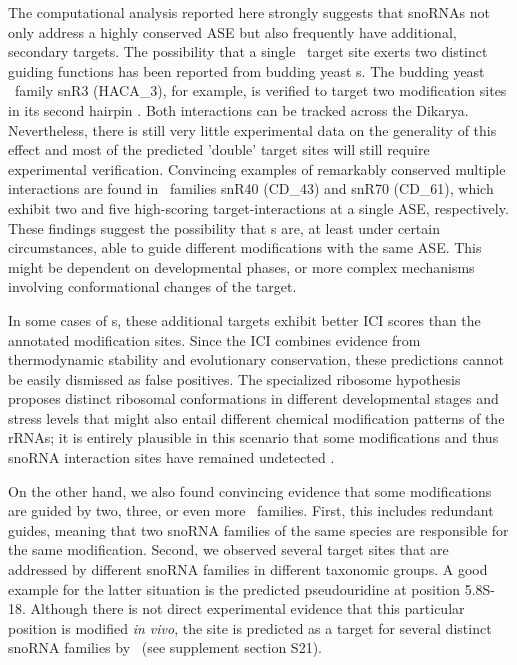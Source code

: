 The computational analysis reported here strongly suggests that
snoRNAs not only address a highly conserved ASE but also frequently
have additional, secondary targets. The possibility that a single
\sno\ target site exerts two distinct guiding functions has been
reported from budding yeast \haca s. The budding yeast \sno\ family
snR3 (HACA\_3), for example, is verified to target two modification
sites in its second hairpin \cite{Schattner:2004}.  Both interactions
can be tracked across the Dikarya.  Nevertheless, there is still very
little experimental data on the generality of this effect and most of
the predicted 'double' target sites will still require experimental
verification. Convincing examples of remarkably conserved multiple
interactions are found in \cd\ families snR40 (CD\_43) and snR70
(CD\_61), which exhibit two and five high-scoring target-interactions
at a single ASE, respectively.  These findings suggest the possibility
that \sno s are, at least under certain circumstances, able to guide
different modifications with the same ASE. This might be dependent on
developmental phases, or more complex mechanisms involving
conformational changes of the target.

In some cases of \haca s, these additional targets exhibit better ICI
scores than the annotated modification sites. Since the ICI combines
evidence from thermodynamic stability and evolutionary conservation,
these predictions cannot be easily dismissed as false positives. The
specialized ribosome hypothesis proposes distinct ribosomal
conformations in different developmental stages and stress levels that
might also entail different chemical modification patterns of the
rRNAs; it is entirely plausible in this scenario that some
modifications and thus snoRNA interaction sites have remained
undetected \citep{Xue:2012}.  

On the other hand, we also found convincing evidence that some
modifications are guided by two, three, or even more \sno\
families. First, this includes redundant guides, meaning that two
snoRNA families of the same species are responsible for the same
modification. Second, we observed several target sites that are
addressed by different snoRNA families in different taxonomic
groups. A good example for the latter situation is the predicted
pseudouridine at position 5.8S-18. Although there is not direct
experimental evidence that this particular position is modified
\emph{in vivo}, the site is predicted as a target for several distinct
snoRNA families by \snoop\ (see supplement section S21).

